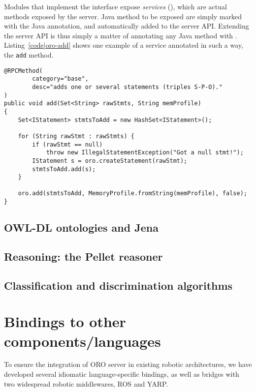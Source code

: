 Modules that implement the  interface expose
\emph{services} (), which are actual methods exposed by the
server. Java method to be exposed are simply marked with the
 Java annotation, and automatically added to the server
API. Extending the server API is thus simply a matter of annotating any Java
method with . Listing~\ref{code|oro-add} shows one
example of a service annotated in such a way, the {\tt add} method.

\lstset{language=java}
\begin{lstlisting}[caption=The {\tt add} method from ORO {\tt BaseModule}, label = code|oro-add]
@RPCMethod(
        category="base",
        desc="adds one or several statements (triples S-P-O)."
)
public void add(Set<String> rawStmts, String memProfile)
{
    Set<IStatement> stmtsToAdd = new HashSet<IStatement>();
    
    for (String rawStmt : rawStmts) {
        if (rawStmt == null)
            throw new IllegalStatementException("Got a null stmt!");
        IStatement s = oro.createStatement(rawStmt);
        stmtsToAdd.add(s);
    }
    
    oro.add(stmtsToAdd, MemoryProfile.fromString(memProfile), false);
}
\end{lstlisting}



\subsection{OWL-DL ontologies and Jena}
\label{sect|jena}

\subsection{Reasoning: the Pellet reasoner}
\label{sect|pellet}

\subsection{Classification and discrimination algorithms}
\label{sect|discrimination}

\section{Bindings to other components/languages}
\label{sect|interfacing}

To ensure the integration of ORO server in existing robotic architectures, we
have developed several idiomatic language-specific bindings, as well as bridges
with two widespread robotic middlewares, ROS and YARP.

